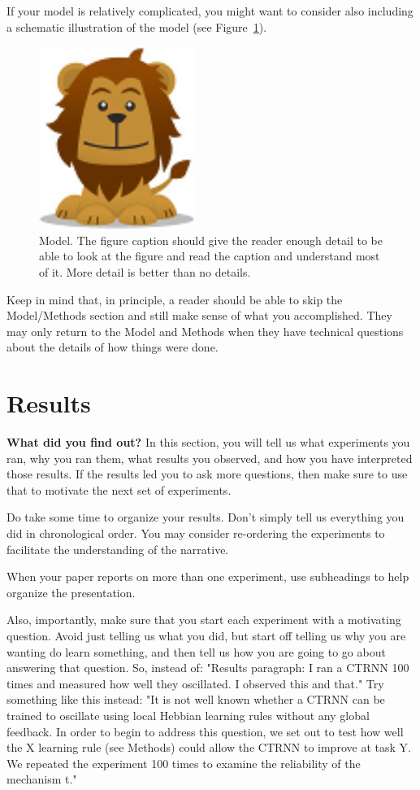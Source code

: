 \documentclass[letterpaper]{article}
\begin{document}
If your model is relatively complicated, you might want to consider also including a schematic illustration of the model (see Figure~\ref{fig1}). 

\begin{figure}[!htb]
\begin{center}
\includegraphics[width=2in]{fig1.png}
\caption{Model. The figure caption should give the reader enough detail to be able to look at the figure and read the caption and understand most of it. More detail is better than no details.}
\label{fig1}
\end{center}
\end{figure}

Keep in mind that, in principle, a reader should be able to skip the Model/Methods section and still make sense of what you accomplished. They may only return to the Model and Methods when they have technical questions about the details of how things were done.

\section{Results}
{\bf What did you find out?} In this section, you will tell us what experiments you ran, why you ran them, what results you observed, and how you have interpreted those results. If the results led you to ask more questions, then make sure to use that to motivate the next set of experiments. 

Do take some time to organize your results. Don't simply tell us everything you did in chronological order. You may consider re-ordering the experiments to facilitate the understanding of the narrative. 

When your paper reports on more than one experiment, use subheadings to help organize the presentation.

Also, importantly, make sure that you start each experiment with a motivating question. Avoid just telling us what you did, but start off telling us why you are wanting do learn something, and then tell us how you are going to go about answering that question. So, instead of: "Results paragraph: I ran a CTRNN 100 times and measured how well they oscillated. I observed this and that." Try something like this instead: "It is not well known whether a CTRNN can be trained to oscillate using local Hebbian learning rules without any global feedback. In order to begin to address this question, we set out to test how well the X learning rule (see Methods)  could allow the CTRNN to improve at task Y. We repeated the experiment 100 times to examine the reliability of the mechanism t." 
\end{document}
